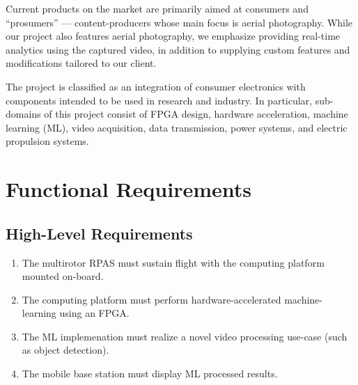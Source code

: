 \documentclass[10pt,letterpaper]{article}
\begin{document}
Current products on the market are primarily aimed at consumers and ``prosumers'' --- content-producers whose main focus is aerial photography. While our project also features aerial photography, we emphasize providing real-time analytics using the captured video, in addition to supplying custom features and modifications tailored to our client.

The project is classified as an integration of consumer electronics with components intended to be used in research and industry. In particular,  sub-domains of this project consist of FPGA design, hardware acceleration, machine learning (ML), video acquisition, data transmission, power systems, and electric propulsion systems. 

\newpage
\section{Functional Requirements}\label{section:funcreq} 

\subsection{High-Level Requirements}
\begin{enumerate}[label=F.HL.\arabic*, wide=1cm, widest=3cm, leftmargin=*, font=\bfseries, noitemsep,topsep=0pt, parsep=4pt, partopsep=0pt]
    \item The multirotor RPAS must sustain flight with the computing platform mounted on-board.
    \item The computing platform must perform hardware-accelerated machine-learning using an FPGA.
    \item The ML implemenation must realize a novel video processing use-case (such as object detection).
    \item The mobile base station must display ML processed results.
\end{enumerate}
\end{document}
